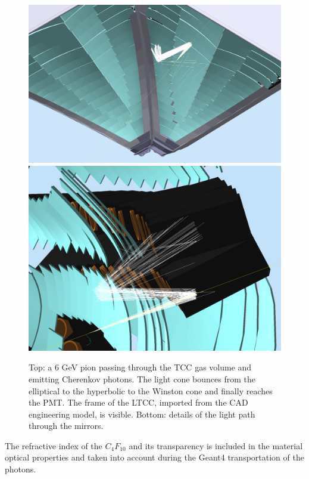 \begin{figure}
	\centering
	\includegraphics[width=0.99\columnwidth,keepaspectratio]{img/ltccGeometry.png}
	\includegraphics[width=0.99\columnwidth,keepaspectratio]{img/ltccDetail.png}
	\caption{Top: a 6 GeV pion passing through the TCC gas volume and emitting Cherenkov photons. The light cone
            bounces from the elliptical to the hyperbolic to the Winston cone and finally reaches the PMT. The
            frame of the LTCC, imported from the CAD engineering model, is visible.
            Bottom: details of the light path through the mirrors. }
	\label{fig:ltccGeometry}
\end{figure}

The refractive index of the $C_4F_{10}$ and its transparency is included in the material optical properties and taken
into account during the Geant4 transportation of the photons.


